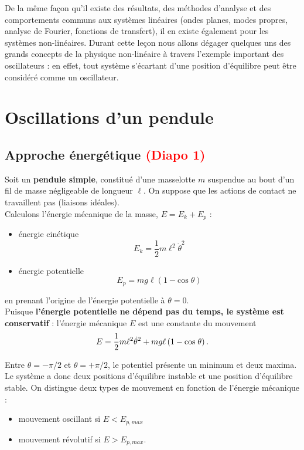 \documentclass[11pt,a4paper]{report}
\begin{document}
De la même façon qu'il existe des résultats, des méthodes d'analyse et des comportements communs aux systèmes linéaires (ondes planes, modes propres, analyse de Fourier, fonctions de transfert), il en existe également pour les systèmes non-linéaires. Durant cette leçon nous allons dégager quelques uns des grands concepts de la physique non-linéaire à travers l'exemple important des oscillateurs : en effet, tout système s'écartant d'une position d'équilibre peut être considéré comme un oscillateur.

\newpage
\section{Oscillations d'un pendule}

\subsection{Approche énergétique \textcolor{red}{(Diapo 1)}}

Soit un \textbf{pendule simple}, constitué d'une masselotte $m$ suspendue au bout d'un fil de masse négligeable de longueur $\ell$. On suppose que les actions de contact ne travaillent pas (liaisons idéales).\\

Calculons l'énergie mécanique de la masse, $E = E_k + E_p$ :
\begin{itemize}
	\item énergie cinétique
	\begin{equation}
		E_k = \frac{1}{2}m \ell^2 \dot{\theta}^2
	\end{equation}
	
	\item énergie potentielle
	\begin{equation}
		E_p = mg\ell \left(1 - \text{cos}\;\theta\right)
	\end{equation}
\end{itemize}
en prenant l'origine de l'énergie potentielle à $\theta = 0$.\\

Puisque \textbf{l'énergie potentielle ne dépend pas du temps, le système est conservatif} : l'énergie mécanique $E$ est une constante du mouvement
\begin{equation}
	E = \frac{1}{2}m \ell^2 \dot{\theta}^2 + mg\ell \left(1 - \text{cos}\;\theta\right).\\
\end{equation}

Entre $\theta = -\pi/2$ et $\theta = +\pi/2$, le potentiel présente un minimum et deux maxima. Le système a donc deux positions d'équilibre instable et une position d'équilibre stable. On distingue deux types de mouvement en fonction de l'énergie mécanique :
\begin{itemize}
	\item mouvement oscillant si $E < E_{p,max}$
	\item mouvement révolutif si $E > E_{p,max}$.
\end{itemize}
\end{document}

